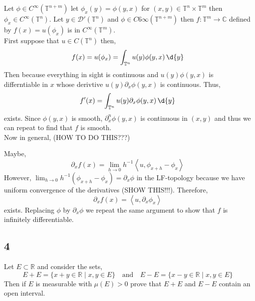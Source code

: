 \documentclass[12pt]{article}
\newcommand{\inner}[2]{\left< #1, #2 \right>}
\newcommand{\R}{\mathbb{R}}
\renewcommand{\C}{\mathbb{C}}
\renewcommand{\T}{\mathbb{T}}
\renewcommand{\D}{\mathcal{D}}
\begin{document}
Let $\phi \in C^\infty(\T^{n+m})$ let $\phi_x(y) = \phi(y, x)$ for $(x, y) \in \T^n \times \T^m$ then $\phi_x \in C^\infty(\T^n)$. Let $y \in \D'(\T^n)$ and $\phi \in C6\infty(\T^{n+m})$ then $f : \T^m \to \C$ defined by $f(x) = u(\phi_x)$ is in $C^\infty(\T^m)$.
\bigskip\\
First suppose that $u \in C(\T^n)$ then,
\[ f(x) = u(\phi_x) = \int_{\T^n} u(y) \phi(y, x) \, \d{y} \]
Then because everything in sight is continuous and $u(y) \phi(y, x)$ is differntiable in $x$ whose derivtive $u(y) \partial_x \phi(y, x)$ is continuous. Thus, 
\[ f'(x) = \int_{\T^n} u(y) \partial_x \phi(y, x) \, \d{y} \]
exists. Since $\phi(y, x)$ is smooth, $\partial_x^n \phi(y, x)$ is continuous in $(x, y)$ and thus we can repeat to find that $f$ is smooth. 
\bigskip\\
Now in general, (HOW TO DO THIS???)


Maybe,
\[ \partial_x f(x) = \lim_{h \to 0} h^{-1} \inner{u}{\phi_{x + h} - \phi_x} \]
However, $\lim_{h \to 0} h^{-1} (\phi_{x + h} - \phi_x) = \partial_x \phi$ in the LF-topology because we have uniform convergence of the derivatives (SHOW THIS!!!). Therefore,
\[ \partial_x f(x) = \inner{u}{\partial_x \phi_x} \]
exists. Replacing $\phi$ by $\partial_x \phi$ we repeat the same argument to show that $f$ is infinitely differentiable.

\subsection{4}

\begin{exercise}
Let $E \subset \R$ and consider the sets,
\[ E + E = \{ x + y \in \R \mid x, y \in E \} \quad \text{and} \quad E - E = \{ x - y \in \R \mid x, y \in E \} \]
Then if $E$ is measurable with $\mu(E) > 0$ prove that $E + E$ and $E - E$ contain an open interval.
\end{exercise}
\end{document}
